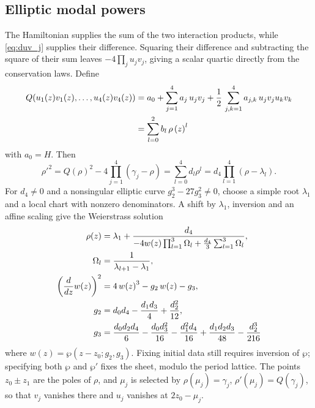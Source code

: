 \documentclass{optica-article}
\numberwithin{equation}{section}
\begin{document}
\subsection{Elliptic modal powers}\label{sec:mode-power}
The Hamiltonian supplies the sum of the two interaction products, while \eqref{eq:duv_j} supplies their difference.
Squaring their difference and subtracting the square of their sum leaves $-4\prod_j u_jv_j$, giving a scalar quartic directly from the conservation laws.
Define
\begin{align}
Q(u_1(z)v_1(z), \dots, u_4(z)v_4(z)) &= a_0 + \sum_{j=1}^{4} a_{j}\, u_j v_j + \frac{1}{2}\,\sum_{j,k=1}^{4} a_{j,k}\, u_j v_j u_k v_k  \notag  \\
& = \sum_{l=0}^{2}b_l\,\rho\left(z\right)^l \label{eq:Q-uv}
\end{align}
with $a_0=H$. Then
\begin{equation}
\rho'^2=Q(\rho)^2-4\prod_{j=1}^4(\gamma_j-\rho)
=\sum_{l=0}^4d_l\rho^l
=d_4\prod_{l=1}^4(\rho-\lambda_l).
\label{eq:drho-sqrd-3}
\end{equation}
For $d_4\ne0$ and a nonsingular elliptic curve $g_2^3-27g_3^2\ne0$, choose a simple root $\lambda_1$ and a local chart with nonzero denominators.
A shift by $\lambda_1$, inversion and an affine scaling give the Weierstrass solution
\begin{align}
\rho{\left(z \right)} &= {\lambda}_{1} + \frac{d_4}{- 4 w{\left(z \right)} \prod_{l=1}^{3} {\Omega}_{l}  + \frac{d_4}{3} \sum_{l=1}^{3} {\Omega}_{l} }, \label{eq:rho-wp-1} \\
\Omega_l &= \frac{1}{\lambda_{l+1} - \lambda_1}, \notag \\
\left(\frac{d}{d z} w{\left(z \right)}\right)^{2} &= 4\,w{\left(z \right)}^3 - g_2\,w{\left(z \right)} - g_3, \label{eq:dwp} \\
g_{2} &= {d}_{0} {d}_{4} - \frac{{d}_{1} {d}_{3}}{4} + \frac{{d}_{2}^{2}}{12}, \label{eq:g2-d} \\
g_{3} &= \frac{{d}_{0} {d}_{2} {d}_{4}}{6} - \frac{{d}_{0} {d}_{3}^{2}}{16} - \frac{{d}_{1}^{2} {d}_{4}}{16} + \frac{{d}_{1} {d}_{2} {d}_{3}}{48} - \frac{{d}_{2}^{3}}{216} \label{eq:3-d}
\end{align}
where $w(z)=\wp(z-z_0;g_2,g_3)$.
Fixing initial data still requires inversion of $\wp$; specifying both $\wp$ and $\wp'$ fixes the sheet, modulo the period lattice.
The points $z_0\pm z_1$ are the poles of $\rho$, and $\mu_j$ is selected by $\rho(\mu_j)=\gamma_j$, $\rho'(\mu_j)=Q(\gamma_j)$, so that $v_j$ vanishes there and $u_j$ vanishes at $2z_0-\mu_j$.
\end{document}
